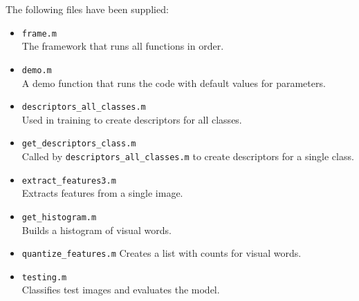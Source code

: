 The following files have been supplied:\\

\begin{itemize}
\item \verb|frame.m|\\
The framework that runs all functions in order.
\item \verb|demo.m|\\
A demo function that runs the code with default values for parameters.
\item \verb|descriptors_all_classes.m|\\
Used in training to create descriptors for all classes.
\item \verb|get_descriptors_class.m|\\
Called by \verb|descriptors_all_classes.m| to create descriptors for a single class.
\item \verb|extract_features3.m|\\
Extracts features from a single image.
\item \verb|get_histogram.m|\\
Builds a histogram of visual words.\\
\item \verb|quantize_features.m|
Creates a list with counts for visual words.
\item \verb|testing.m|\\
Classifies test images and evaluates the model.
\end{itemize}